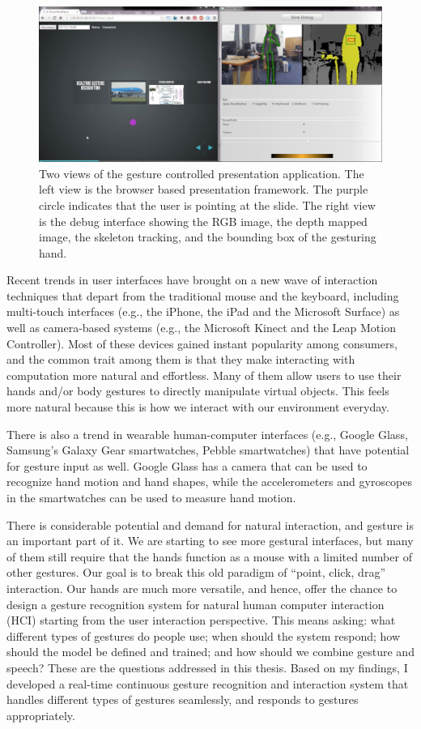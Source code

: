 \begin{figure}[tbh]
\centering
\includegraphics[width=\textwidth]{figures/point_ppt.png}
\caption{Two views of the gesture controlled presentation application. The
left view is the browser based presentation framework. The purple
circle indicates that the user is pointing at the slide. The right view is the
debug interface showing the RGB image, the depth mapped image, the skeleton
tracking, and the bounding box of the gesturing hand.}
\label{fig:demo-point}
\end{figure}
 
Recent trends in user interfaces have brought on a new wave of interaction
techniques that depart from the traditional mouse and the keyboard,
including multi-touch interfaces (e.g., the iPhone, the iPad and the Microsoft 
Surface) as well as camera-based systems (e.g., 
the Microsoft Kinect and the Leap Motion Controller). Most
of these devices gained instant popularity among consumers, and the common trait
among them is that they make interacting with computation more natural and 
effortless. Many of them allow users to use their hands and/or body 
gestures to directly manipulate virtual objects. This feels more natural 
because this is how we interact with our environment everyday.
 
There is also a trend in wearable human-computer interfaces 
(e.g., Google Glass, Samsung's Galaxy Gear smartwatches, Pebble
smartwatches) that have potential for gesture input as well. Google
Glass has a camera that can be used to recognize hand motion and hand shapes,
while the accelerometers and gyroscopes in the smartwatches can be used to
measure hand motion.

There is considerable potential and demand for natural interaction, and gesture
is an important part of it. We are starting to see more gestural
interfaces, but many of them still require that the hands function as a mouse
with a limited number of other gestures. Our goal is to break this old
paradigm of ``point, click, drag'' interaction. 
Our hands are much more versatile, and hence, offer the chance to design a
gesture recognition system for natural human computer interaction (HCI)
starting from the user interaction perspective. This means asking: what 
different types of gestures do people use; when should the system respond; how
should the model be defined and trained; and how should we combine gesture and
speech? These are the questions addressed in this thesis. Based on my
findings, I developed a real-time continuous gesture recognition and
interaction system that handles different types of gestures seamlessly, and
responds to gestures appropriately.

